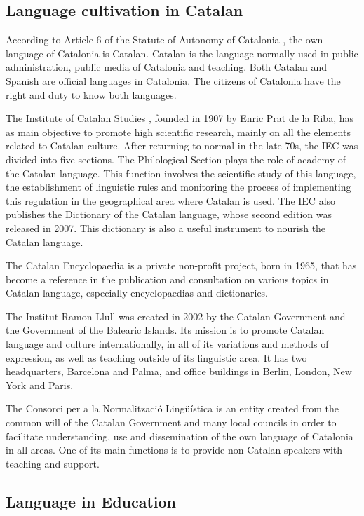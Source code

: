 \begin{multicols}{2}
\subsection{Language cultivation in Catalan}

According to Article 6 of the Statute of Autonomy of Catalonia \cite{CAT-estatut}, the own language of Catalonia is Catalan. Catalan is the language normally used in public administration, public media of Catalonia and teaching. Both Catalan and Spanish are official languages in Catalonia. The citizens of Catalonia have the right and duty to know both languages.

The Institute of Catalan Studies \cite{CAT-IEC}, founded in 1907 by Enric Prat de la Riba, has as main objective to promote high scientific research, mainly on all the elements related to Catalan culture. After returning to normal in the late 70s, the IEC was divided into five sections. The Philological Section plays the role of academy of the Catalan language. This function involves the scientific study of this language, the establishment of linguistic rules and monitoring the process of implementing this regulation in the geographical area where Catalan is used. The IEC also publishes the Dictionary of the Catalan language, whose second edition was released in 2007. This dictionary is also a useful instrument to nourish the Catalan language.

The Catalan Encyclopaedia \cite{CAT-enciclopedia} is a private non-profit project, born in 1965, that has become a reference in the publication and consultation on various topics in Catalan language, especially encyclopaedias and dictionaries.

The Institut Ramon Llull \cite{CAT-Nota12} was created in 2002 by the Catalan Government and the Government of the Balearic Islands. Its mission is to promote Catalan language and culture internationally, in all of its variations and methods of expression, as well as teaching outside of its linguistic area. It has two headquarters, Barcelona and Palma, and office buildings in Berlin, London, New York and Paris.

The Consorci per a la Normalització Lingüística \cite{CAT-cpnl} is an entity created from the common will of the Catalan Government and many local councils in order to facilitate understanding, use and dissemination of the own language of Catalonia in all areas. One of its main functions is to provide non-Catalan speakers with teaching and support.

\subsection{Language in Education}


\end{multicols}
